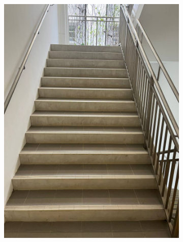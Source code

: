 \documentclass[12pt]{report}
\begin{document}
\begin{figure}[h]
    \centering
    \begin{subfigure}[b]{0.26\textwidth}
        \centering
        \includegraphics[width=\textwidth]{stairs-up}
    \end{subfigure}
    \begin{subfigure}[b]{0.26\textwidth}
        \centering

\end{subfigure}
\end{figure}
\end{document}

